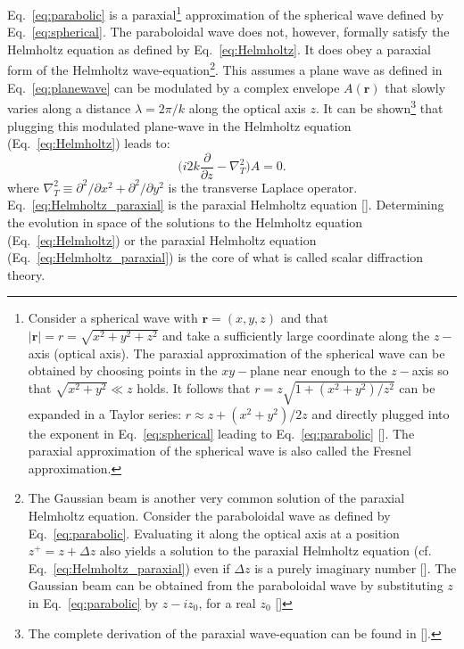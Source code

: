 \begin{refsection}
Eq.~\ref{eq:parabolic} is a paraxial\footnote{Consider a spherical wave with $\textbf{r}=(x,y,z)$ and that $\vert\textbf{r}\vert=r=\sqrt{x^2 + y^2 +z^2}$ and take a sufficiently large coordinate along the $z-$axis (optical axis). The paraxial approximation of the spherical wave can be obtained by choosing points in the $xy-$plane near enough to the $z-$axis so that $\sqrt{x^2+y^2}\ll z$ holds. It follows that $r=z\sqrt{1+(x^2+y^2)/z^2}$ can be expanded in a Taylor series: $r\approx z+(x^2+y^2)/2z$ and directly plugged into the exponent in Eq.~\ref{eq:spherical} leading to Eq.~\ref{eq:parabolic} [\cite[\textit{§2.2}]{Saleh2019}]. The paraxial approximation of the spherical wave is also called the Fresnel approximation.\label{note:fresnel}} approximation of the spherical wave defined by Eq.~\ref{eq:spherical}. The paraboloidal wave does not, however, formally satisfy the Helmholtz equation as defined by Eq.~\ref{eq:Helmholtz}. It does obey a paraxial form of the Helmholtz wave-equation\footnote{The Gaussian beam is another very common solution of the paraxial Helmholtz equation. Consider the paraboloidal wave as defined by Eq.~\ref{eq:parabolic}. Evaluating it along the optical axis at a position $z^+=z+\Delta z$ also yields a solution to the paraxial Helmholtz equation (cf. Eq.~\ref{eq:Helmholtz_paraxial}) even if $\Delta z$ is a purely imaginary number [\cite[\textit{Exercise 2.2-2}]{Saleh2019}]. The Gaussian beam can be obtained from the paraboloidal wave by substituting $z$ in Eq.~\ref{eq:parabolic} by $z-iz_0$, for a real $z_0$ [\cite[\textit{§3.1}]{Saleh2019}]}. This assumes a plane wave as defined in Eq.~\ref{eq:planewave} can be modulated by a complex envelope $A(\textbf{r})$ that slowly varies along a distance $\lambda=2\pi/k$ along the optical axis $z$. It can be shown\footnote{The complete derivation of the paraxial wave-equation can be found in [\cite[\textit{§2.2.C}]{Saleh2019}].} that plugging this modulated plane-wave in the Helmholtz equation (Eq.~\ref{eq:Helmholtz}) leads to:
\begin{equation}\label{eq:Helmholtz_paraxial}
    \Bigg(i2k\frac{\partial}{\partial z}-\nabla^2_T\Bigg)A=0.
\end{equation}
where $\nabla^2_T\equiv\partial^2/\partial x^2 + \partial^2/\partial y^2$ is the transverse Laplace operator. Eq.~\ref{eq:Helmholtz_paraxial} is the paraxial Helmholtz equation [\cite[\textit{§2.2}]{Saleh2019}]. Determining the evolution in space of the solutions to the Helmholtz equation (Eq.~\ref{eq:Helmholtz}) or the paraxial Helmholtz equation (Eq.~\ref{eq:Helmholtz_paraxial}) is the core of what is called scalar diffraction theory.


\end{refsection}
